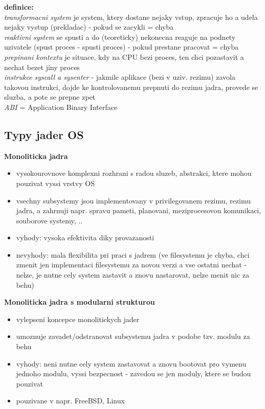 \documentclass[a4paper, 11pt]{article}
\begin{document}
\noindent\textbf{definice:} \\[0.5em] \label{prepinani-kontextu-jadro}
\textit{transformacni system} je system, ktery dostane nejaky vstup, zpracuje ho a udela nejaky vystup (prekladac) - pokud se zacykli = chyba \\[0.2em]
\textit{reaktivni system} se spusti a do (teoreticky) nekonecna reaguje na podnety uzivatele (spust proces - spusti proces) - pokud prestane pracovat = chyba \\[0.2em]
\textit{prepinani kontextu} je situace, kdy na CPU bezi proces, ten chci pozastavit a nechat bezet jiny proces \\[0.2em]
\textit{instrukce syscall a sysenter} - jakmile aplikace (bezi v uziv. rezimu) zavola takovou instrukci, dojde ke kontrolovanemu prepnuti do rezimu jadra, provede se sluzba, a pote se prepne zpet \\[0.2em]
\textit{ABI} = Application Binary Interface

\newpage

\subsection{Typy jader OS}

\noindent\textbf{Monoliticka jadra}
\begin{itemize}
    \item vysokourovnove komplexni rozhrani s radou sluzeb, abstrakci, ktere mohou pouzivat vyssi vrstvy OS
    \item vsechny subsystemy jsou implementovany v privilegovanem rezimu, rezimu jadra, a zahrnuji napr. spravu pameti, planovani, meziprocesovou komunikaci, souborove systemy, ..
    \item vyhody: vysoka efektivita diky provazanosti
    \item nevyhody: mala flexibilita pri praci s jadrem (ve filesystemu je chyba, chci zmenit jen implementaci filesystemu za novou verzi a vse ostatni nechat - nelze, je nutne cely system zastavit a znovu nastarovat, nelze menit nic za behu) \\
\end{itemize}

\noindent\textbf{Monoliticka jadra s modularni strukturou}
\begin{itemize}
    \item vylepseni koncepce monolitickych jader
    \item umoznuje zavadet/odstranovat subsystemu jadra v podobe tzv. modulu za behu
    \item vyhody: neni nutne cely system zastavovat a znovu bootovat pro vymenu jednoho modulu, vyssi bezpecnost - zavedou se jen moduly, ktere se budou pouzivat
    \item pouzivane v napr. FreeBSD, Linux \\
\end{itemize}
\end{document}

